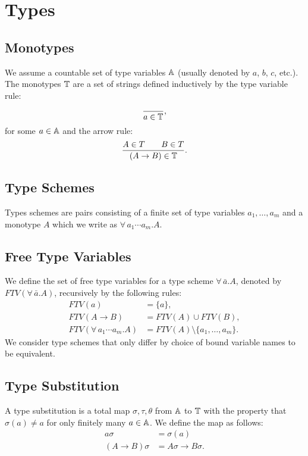 \section{Types}

\subsection{Monotypes}

We assume a countable set of type variables $\mathbb{A}$ (usually
denoted by $a$, $b$, $c$, etc.). The monotypes $\mathbb{T}$ are a
set of strings defined inductively by the type variable rule:
\begin{align*}
    \frac{}{a \in \mathbb{T}},
\end{align*} for some $a \in \mathbb{A}$ and the arrow rule: \begin{align*}
    \frac{A \in T \qquad B \in T}{(A \to B) \in \mathbb{T}}.
\end{align*}

\subsection{Type Schemes}

Types schemes are pairs consisting of a finite set of type
variables $a_1, \ldots, a_m$ and a monotype $A$ which we
write as $\forall \, a_1 \cdots a_m.A$.

\subsection{Free Type Variables}

We define the set of free type variables for a type scheme
$\forall \, \bar{a}.A$, denoted by
\linebreak $FTV(\forall \, \bar{a}.A)$,
recursively by the following rules: \begin{align*}
    FTV(a) &= \{a\}, \\
    FTV(A \to B) &= FTV(A) \cup FTV(B), \\
    FTV(\forall \, a_1 \cdots a_m.A) &= FTV(A) \setminus \{a_1, \ldots, a_m\}.
\end{align*} We consider type schemes that only differ by choice
of bound variable names to be equivalent.

\subsection{Type Substitution}

A type substitution is a total map $\sigma, \tau, \theta$ 
from $\mathbb{A}$ to 
$\mathbb{T}$ with the property that $\sigma(a) \neq a$ for only
finitely many $a \in \mathbb{A}$. We define the map as follows:
\begin{align*}
    a\sigma &= \sigma(a) \\
    (A \to B)\sigma &= A\sigma \to B\sigma.
\end{align*}

